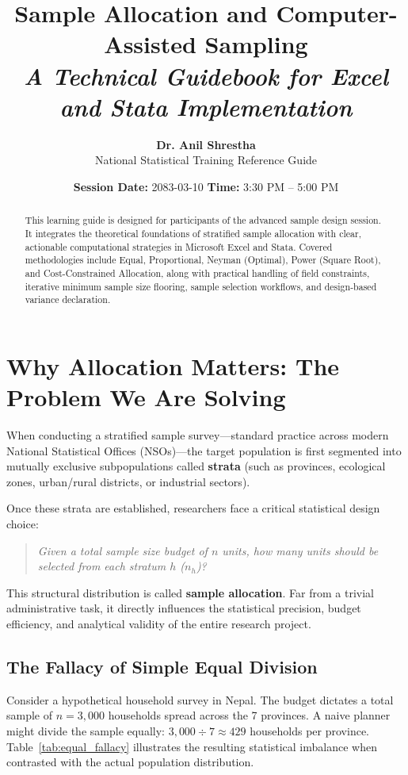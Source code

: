 \documentclass[11pt, a4paper]{article}
\title{
    \vspace{-1.5cm}
    \textbf{\color{primaryblue}Sample Allocation and Computer-Assisted Sampling}\\
    \large\textit{A Technical Guidebook for Excel and Stata Implementation}
}
\author{\textbf{Dr. Anil Shrestha} \\ National Statistical Training Reference Guide}
\date{\textbf{Session Date:} 2083-03-10 \quad \textbf{Time:} 3:30 PM -- 5:00 PM}
\begin{document}
\maketitle

\begin{abstract}
This learning guide is designed for participants of the advanced sample design session. It integrates the theoretical foundations of stratified sample allocation with clear, actionable computational strategies in Microsoft Excel and Stata. Covered methodologies include Equal, Proportional, Neyman (Optimal), Power (Square Root), and Cost-Constrained Allocation, along with practical handling of field constraints, iterative minimum sample size flooring, sample selection workflows, and design-based variance declaration.
\end{abstract}

\tableofcontents
\newpage

\section{Why Allocation Matters: The Problem We Are Solving}

When conducting a stratified sample survey---standard practice across modern National Statistical Offices (NSOs)---the target population is first segmented into mutually exclusive subpopulations called \textbf{strata} (such as provinces, ecological zones, urban/rural districts, or industrial sectors). 

Once these strata are established, researchers face a critical statistical design choice:
\begin{quote}
    \textit{Given a total sample size budget of $n$ units, how many units should be selected from each stratum $h$ ($n_h$)?}
\end{quote}
This structural distribution is called \textbf{sample allocation}. Far from a trivial administrative task, it directly influences the statistical precision, budget efficiency, and analytical validity of the entire research project.

\subsection{The Fallacy of Simple Equal Division}
Consider a hypothetical household survey in Nepal. The budget dictates a total sample of $n = 3,000$ households spread across the 7 provinces. A naive planner might divide the sample equally: $3,000 \div 7 \approx 429$ households per province. Table~\ref{tab:equal_fallacy} illustrates the resulting statistical imbalance when contrasted with the actual population distribution.
\end{document}
